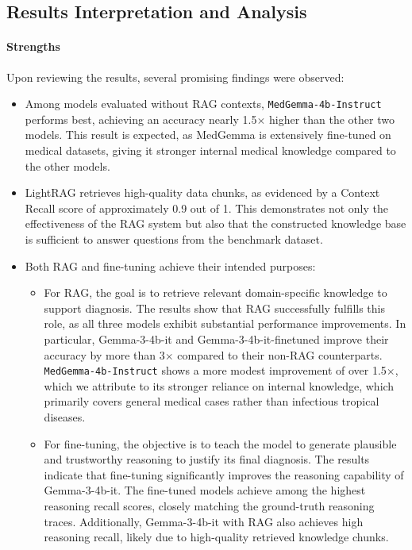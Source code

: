 \subsection{Results Interpretation and Analysis}
\label{sec:interpretation}

\paragraph{Strengths}
Upon reviewing the results, several promising findings were observed:
\begin{itemize}
    \item Among models evaluated without \ac{RAG} contexts, \texttt{MedGemma-4b-Instruct} performs best, achieving an accuracy nearly 1.5$\times$ higher than the other two models. This result is expected, as MedGemma is extensively fine-tuned on medical datasets, giving it stronger internal medical knowledge compared to the other models.
    
    \item LightRAG retrieves high-quality data chunks, as evidenced by a Context Recall score of approximately 0.9 out of 1. This demonstrates not only the effectiveness of the RAG system but also that the constructed knowledge base is sufficient to answer questions from the benchmark dataset.
    
    \item Both \ac{RAG} and fine-tuning achieve their intended purposes:
    \begin{itemize}
        \item For \ac{RAG}, the goal is to retrieve relevant domain-specific knowledge to support diagnosis. The results show that RAG successfully fulfills this role, as all three models exhibit substantial performance improvements. In particular, Gemma-3-4b-it and Gemma-3-4b-it-finetuned improve their accuracy by more than 3$\times$ compared to their non-RAG counterparts. \texttt{MedGemma-4b-Instruct} shows a more modest improvement of over 1.5$\times$, which we attribute to its stronger reliance on internal knowledge, which primarily covers general medical cases rather than infectious tropical diseases.
        
        \item For fine-tuning, the objective is to teach the model to generate plausible and trustworthy reasoning to justify its final diagnosis. The results indicate that fine-tuning significantly improves the reasoning capability of Gemma-3-4b-it. The fine-tuned models achieve among the highest reasoning recall scores, closely matching the ground-truth reasoning traces. Additionally, Gemma-3-4b-it with RAG also achieves high reasoning recall, likely due to high-quality retrieved knowledge chunks.
    \end{itemize}
\end{itemize}

